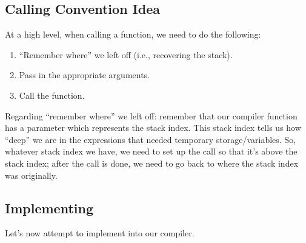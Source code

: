 \subsection{Calling Convention Idea}
At a high level, when calling a function, we need to do the following: 
\begin{enumerate}
    \item ``Remember where'' we left off (i.e., recovering the stack).
    \item Pass in the appropriate arguments. 
    \item Call the  function.
\end{enumerate}
Regarding ``remember where'' we left off: remember that our compiler function has a parameter which represents the stack index. This stack index tells us how ``deep'' we are in the expressions that needed temporary storage/variables. So, whatever stack index we have, we need to set up the call so that it's above the stack index; after the call is done, we need to go back to where the stack index was originally.

\subsection{Implementing }
Let's now attempt to implement  into our compiler.

